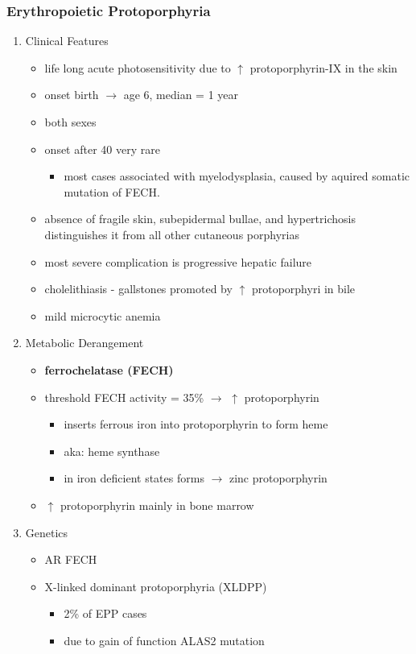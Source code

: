 \documentclass[12pt]{scrartcl}
\begin{document}
\subsubsection{Erythropoietic Protoporphyria}
\label{sec:org37adcad}
\begin{enumerate}
\item Clinical Features
\label{sec:org2c6a8dd}
\begin{itemize}
\item life long acute photosensitivity due to \(\uparrow\) protoporphyrin-IX
in the skin
\item onset birth \(\to\) age 6, median = 1 year
\item both sexes
\item onset after 40 very rare
\begin{itemize}
\item most cases associated with myelodysplasia, caused by aquired
somatic mutation of FECH.
\end{itemize}
\item absence of fragile skin, subepidermal bullae, and hypertrichosis
distinguishes it from all other cutaneous porphyrias
\item most severe complication is progressive hepatic failure
\item cholelithiasis - gallstones promoted by \(\uparrow\) protoporphyri in bile
\item mild microcytic anemia
\end{itemize}

\item Metabolic Derangement
\label{sec:org80ad2c1}
\begin{itemize}
\item \textbf{ferrochelatase (FECH)}
\item threshold FECH activity = 35\% \(\to\) \(\uparrow\) protoporphyrin
\begin{itemize}
\item inserts ferrous iron into protoporphyrin to form heme
\item aka: heme synthase
\item in iron deficient states forms \(\to\) zinc protoporphyrin
\end{itemize}
\item \(\uparrow\) protoporphyrin mainly in bone marrow
\end{itemize}

\item Genetics
\label{sec:org4a3881b}
\begin{itemize}
\item AR FECH
\item X-linked dominant protoporphyria (XLDPP)
\begin{itemize}
\item 2\% of EPP cases
\item due to gain of function ALAS2 mutation
\end{itemize}
\end{itemize}


\end{enumerate}
\end{document}
